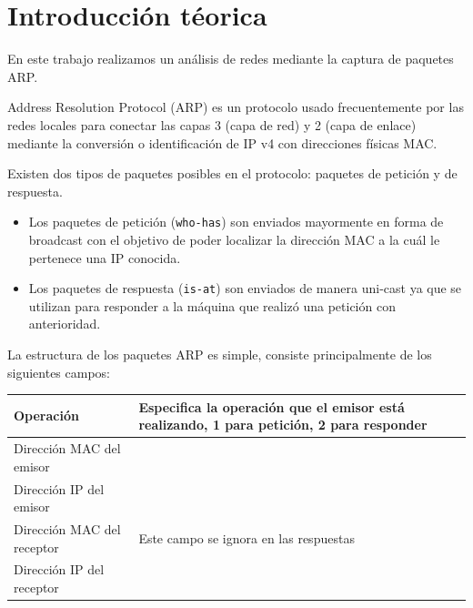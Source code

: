 \documentclass[a4paper, 10pt, twoside]{article}
\begin{document}
\newpage




\tableofcontents

\newpage




\section{Introducción téorica}
En este trabajo realizamos un análisis de redes mediante la captura de paquetes ARP.

Address Resolution Protocol (ARP) es un protocolo usado frecuentemente por las redes locales para conectar las capas 3 (capa de red) y 2 (capa de enlace) mediante la conversión o identificación de IP v4 con direcciones físicas MAC.

Existen dos tipos de paquetes posibles en el protocolo: paquetes de petición y de respuesta.
\begin{itemize}
	\item Los paquetes de petición (\texttt{who-has}) son enviados mayormente en forma de broadcast con el objetivo de poder localizar la dirección MAC a la cuál le pertenece una IP conocida.
	\item Los paquetes de respuesta (\texttt{is-at}) son enviados de manera uni-cast ya que se utilizan para responder a la máquina que realizó una petición con anterioridad.
\end{itemize}

La estructura de los paquetes ARP es simple, consiste principalmente de los siguientes campos:

\begin{tabular}{| l | p{10cm} |}
	\hline
	Operación & Especifica la operación que el emisor está realizando, 1 para petición, 2 para responder \\ \hline
	Dirección MAC del emisor & \\ \hline
	Dirección IP del emisor & \\ \hline
	Dirección MAC del receptor & Este campo se ignora en las respuestas \\ \hline
	Dirección IP del receptor & \\ \hline
\end{tabular}
\end{document}
